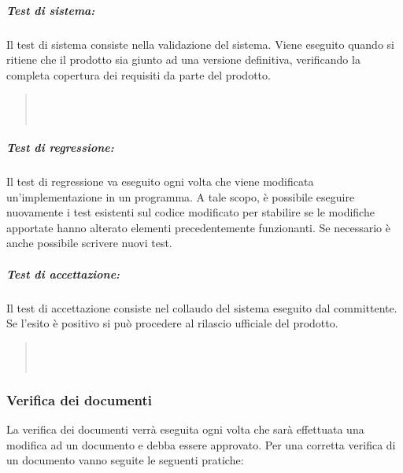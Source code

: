 		\subparagraph{Test di sistema:}
		Il test di sistema consiste nella validazione del sistema. Viene eseguito quando si ritiene che il prodotto sia giunto ad una versione definitiva, verificando la completa copertura dei requisiti da parte del prodotto.
		\begin{quote}
			\\
			\\
		\end{quote}
		
		\subparagraph{Test di regressione:}
		Il test di regressione va eseguito ogni volta che viene modificata un'implementazione in un programma. A tale scopo, è possibile eseguire nuovamente i test esistenti sul codice modificato per stabilire se le modifiche apportate hanno alterato elementi precedentemente funzionanti. Se necessario è anche possibile scrivere nuovi test.
		
		\subparagraph{Test di accettazione:}
		Il test di accettazione consiste nel collaudo del sistema eseguito dal committente. Se l'esito è positivo si può procedere al rilascio ufficiale del prodotto.
		\begin{quote}
			\\
			\\
		\end{quote}

\subsubsection{Verifica dei documenti}
La verifica dei documenti verrà eseguita ogni volta che sarà effettuata una modifica ad un documento e debba essere approvato.
Per una corretta verifica di un documento vanno seguite le seguenti pratiche:

